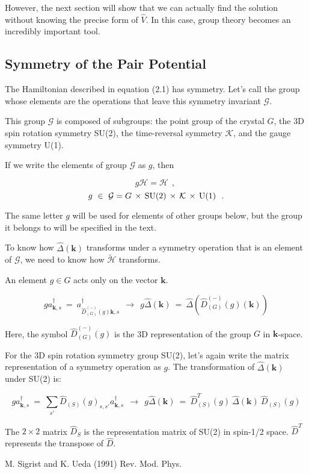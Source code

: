 \documentclass[uplatex,a4j,12pt,dvipdfmx]{jsarticle}
\begin{document}
However, the next section will show that we can actually find the solution without knowing the precise form of $\hat{V}$.
In this case, group theory becomes an incredibly important tool.
\subsection{Symmetry of the Pair Potential}

The Hamiltonian described in equation (2.1) has symmetry.
Let's call the group whose elements are the operations that leave this symmetry invariant $\mathcal{G}$.

This group $\mathcal{G}$ is composed of subgroups: the point group of the crystal $G$, the 3D spin rotation symmetry SU(2), the time-reversal symmetry $\mathcal{K}$, and the gauge symmetry U(1).

If we write the elements of group $\mathcal{G}$ as $g$, then

\[
	g
	\mathcal{H}
	=
	\mathcal{H}
	\ \ ,
	\ \]\[
	g
	\ \in \
	\mathcal{G}
	=
	G \ \! \times \ \! {\rm SU(2)} \ \! \times \ \! \mathcal{K} \ \! \times \ \! {\rm U(1)}
	\ \ .
	\nonumber
\]

The same letter $g$ will be used for elements of other groups below, but the group it belongs to will be specified in the text.

To know how $\hat{\Delta}(\bm{k})$ transforms under a symmetry operation that is an element of $\mathcal{G}$, we need to know how $\tilde{\mathcal{H}}$ transforms.

An element $g \in G$ acts only on the vector $\bm{k}$.

\[
	g a_{\bm{k},s}^{\dagger}
	\ = \
	a_{ \hat{D}_{(G)}^{(-)}(g) \bm{k},s}^{\dagger}
	\ \ \longrightarrow \ \
	g \hat{\Delta}(\bm{k})
	\ = \
	\hat{\Delta}(\hat{D}_{(G)}^{(-)}(g) (\bm{k}))
\]

Here, the symbol $\hat{D}_{(G)}^{(-)}(g)$ is the 3D representation of the group $G$ in $\bm{k}$-space.

For the 3D spin rotation symmetry group SU(2), let's again write the matrix representation of a symmetry operation as $g$.
The transformation of $\hat{\Delta}(\bm{k})$ under SU(2) is:

\[
	g a_{\bm{k},s}^{\dagger}
	\ = \
	\sum_{s'}
	\hat{D}_{(S)} (g)_{s,s'}
	a_{\bm{k},s}^{\dagger}
	\ \ \longrightarrow \ \
	g \hat{\Delta}(\bm{k})
	\ = \
	\hat{D}_{(S)}^{T} (g) \ \!
	\hat{\Delta}(\bm{k}) \ \!
	\hat{D}_{(S)} (g)
\]

The $2 \times 2$ matrix $\hat{D}_{S}$ is the representation matrix of SU(2) in spin-1/2 space.
$\hat{D}^{T}$ represents the transpose of $\hat{D}$.

\begin{thebibliography}{9}
	 M. Sigrist and K. Ueda (1991) Rev. Mod. Phys.

\end{thebibliography}
\end{document}
